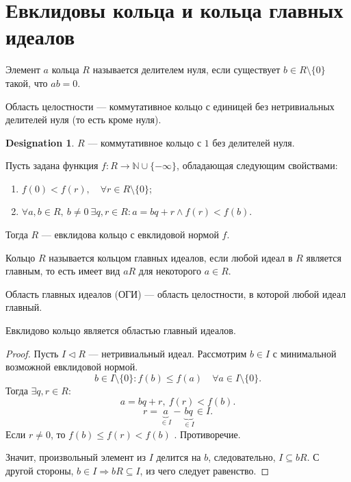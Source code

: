 \documentclass[11pt]{book}
\newcommand{\N}{\mathbb{N}}
\renewcommand{\le}{\leqslant}
\theoremstyle{definition}
\theoremstyle{plain}
\theoremstyle{plain}
\theoremstyle{definition}
\newtheorem*{name}{Designation}
\theoremstyle{remark}
\begin{document}
\section{Евклидовы кольца и кольца главных идеалов}
\begin{defn}
    Элемент $ a $ кольца $ R$ называется {\sf делителем  нуля}, если существует  $ b \in R \setminus \{0\}$ такой, что $ ab = 0$.

    {\sf Область целостности} --- коммутативное кольцо с единицей без  нетривиальных делителей нуля (то есть кроме нуля).
\end{defn}
\begin{name}
    $ R$ --- коммутативное кольцо с $ 1$ без делителей нуля.
\end{name}
\begin{defn}
    Пусть задана функция $ f: R \to  \N \cup \{-\infty\}$, обладающая следующим свойствами:
    \begin{enumerate}[noitemsep]
	\item $ f(0) < f(r), \quad \forall  r \in  R \setminus \{0\}$;
	\item $ \forall a, b \in  R, ~b\ne 0 ~ \exists  q, r \in R: a = b q + r \wedge f(r) < f(b)$.
    \end{enumerate}
    Тогда $ R$ --- {\sf евклидова кольцо с евклидовой нормой  $ f$}.
\end{defn}
\begin{defn}
    Кольцо $ R$ называется {\sf  кольцом главных идеалов}, если любой идеал в  $ R$ является главным, то есть имеет вид  $ aR$ для некоторого  $ a \in R$.

    {\sf Область главных идеалов (ОГИ)} --- область целостности, в которой любой идеал главный.
\end{defn}
\begin{thm}
    Евклидово кольцо является областью главный идеалов.
\end{thm}
\begin{proof}
    Пусть  $ I \triangleleft  R$ --- нетривиальный идеал.
    Рассмотрим $ b \in I$ с минимальной возможной евклидовой нормой.
    \[
	b \in  I \setminus \{0\}: f(b) \le  f(a) \quad \forall  a \in  I \setminus \{0\}
    .\]
    Тогда $ \exists q, r \in R$:
    \[
	a = b q + r , ~ f(r) < f(b)
    .\]
    \[
	r = \underbrace{a}_{\in I} - \underbrace{bq}_{ \in  I} \in  I
    .\]
    Если $r \ne 0$, то $ f(b) \le  f(r) < f(b)$ . Противоречие.

    Значит, произвольный элемент из $ I$ делится на  $ b$, следовательно,  $ I \subseteq bR$. С другой стороны, $ b \in I \Longrightarrow bR \subseteq I$, из чего следует равенство.
\end{proof}
\end{document}
